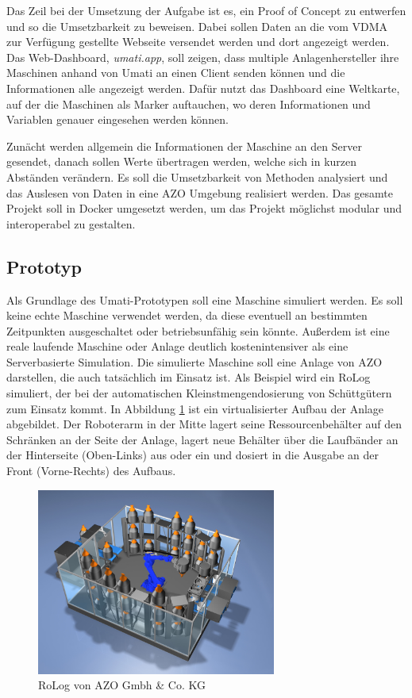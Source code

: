 \documentclass[a4paper, 12pt, oneside]{scrbook}
\begin{document}
		Das Zeil bei der Umsetzung der Aufgabe ist es, ein Proof of Concept zu entwerfen und so die Umsetzbarkeit zu beweisen. Dabei sollen Daten an die vom VDMA zur Verfügung gestellte Webseite versendet werden und dort angezeigt werden. Das Web-Dashboard, \textit{umati.app}, soll zeigen, dass multiple Anlagenhersteller ihre Maschinen anhand von Umati an einen Client senden können und die Informationen alle angezeigt werden. Dafür nutzt das Dashboard eine Weltkarte, auf der die Maschinen als Marker auftauchen, wo deren Informationen und Variablen genauer eingesehen werden können.
		
		Zunächt werden allgemein die Informationen der Maschine an den Server gesendet, danach sollen Werte übertragen werden, welche sich in kurzen Abständen verändern. Es soll die Umsetzbarkeit von Methoden analysiert und das Auslesen von Daten in eine AZO Umgebung realisiert werden. Das gesamte Projekt soll in Docker umgesetzt werden, um das Projekt möglichst modular und interoperabel zu gestalten.
		
		
		\subsection{Prototyp}
		Als Grundlage des Umati-Prototypen soll eine Maschine simuliert werden. Es soll keine echte Maschine verwendet werden, da diese eventuell an bestimmten Zeitpunkten ausgeschaltet oder betriebsunfähig sein könnte. Außerdem ist eine reale laufende Maschine oder Anlage deutlich kostenintensiver als eine Serverbasierte Simulation. Die simulierte Maschine soll eine Anlage von AZO darstellen, die auch tatsächlich im Einsatz ist. Als Beispiel wird ein RoLog simuliert, der bei der automatischen Kleinstmengendosierung von Schüttgütern zum Einsatz kommt. In Abbildung \ref{fig:RoLog} ist ein virtualisierter Aufbau der Anlage abgebildet. Der Roboterarm in der Mitte lagert seine Ressourcenbehälter auf den Schränken an der Seite der Anlage, lagert neue Behälter über die Laufbänder an der Hinterseite (Oben-Links) aus oder ein und dosiert in die Ausgabe an der Front (Vorne-Rechts) des Aufbaus. \cite{noauthor_azo_nodate}
		
		\begin{figure}[H]
			\centering
			\includegraphics[width=0.7\textwidth]{res/RoLog.png}
			\caption{RoLog von AZO Gmbh \& Co. KG \cite{noauthor_azo_nodate}}
			\label{fig:RoLog}
		\end{figure}
		
\end{document}
